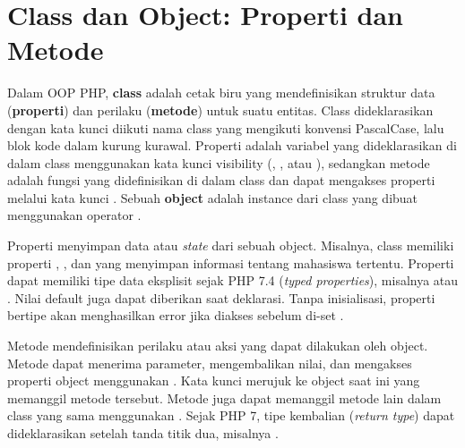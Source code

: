 \section{Class dan Object: Properti dan Metode}

Dalam OOP PHP, \textbf{class} adalah cetak biru yang mendefinisikan struktur data (\textbf{properti}) dan perilaku (\textbf{metode}) untuk suatu entitas. Class dideklarasikan dengan kata kunci  diikuti nama class yang mengikuti konvensi PascalCase, lalu blok kode dalam kurung kurawal. Properti adalah variabel yang dideklarasikan di dalam class menggunakan kata kunci visibility (, , atau ), sedangkan metode adalah fungsi yang didefinisikan di dalam class dan dapat mengakses properti melalui kata kunci . Sebuah \textbf{object} adalah instance dari class yang dibuat menggunakan operator  \cite{phpManual}.

Properti menyimpan data atau \textit{state} dari sebuah object. Misalnya, class  memiliki properti , , dan  yang menyimpan informasi tentang mahasiswa tertentu. Properti dapat memiliki tipe data eksplisit sejak PHP 7.4 (\textit{typed properties}), misalnya  atau . Nilai default juga dapat diberikan saat deklarasi. Tanpa inisialisasi, properti bertipe akan menghasilkan error jika diakses sebelum di-set \cite{phpRightWay}.

Metode mendefinisikan perilaku atau aksi yang dapat dilakukan oleh object. Metode dapat menerima parameter, mengembalikan nilai, dan mengakses properti object menggunakan . Kata kunci  merujuk ke object saat ini yang memanggil metode tersebut. Metode juga dapat memanggil metode lain dalam class yang sama menggunakan . Sejak PHP 7, tipe kembalian (\textit{return type}) dapat dideklarasikan setelah tanda titik dua, misalnya  \cite{phpManual}.


